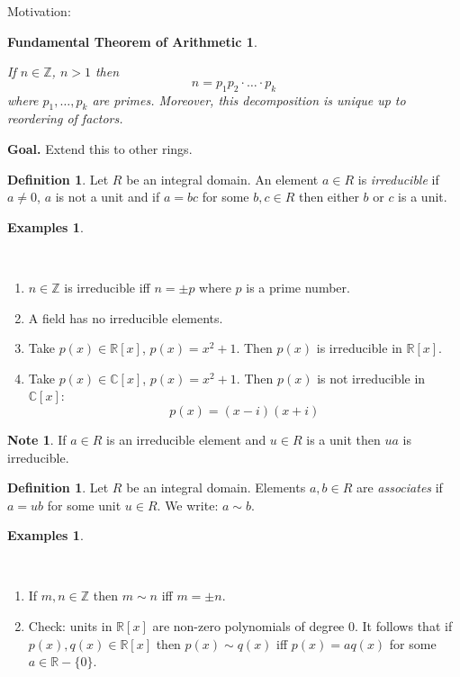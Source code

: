 \documentclass[12pt, letterpaper, oneside]{article}
\theoremstyle{plain}
\newtheorem{FTA}[theorem]{Fundamental Theorem of Arithmetic}
\theoremstyle{definition}
\newtheorem{definition}[theorem]{Definition}
\newtheorem{examples}[theorem]{Examples}
\newtheorem{note}[theorem]{Note}
\newcommand{\Z}{{\mathbb Z}}
\newcommand{\R}{{\mathbb R}}
\newcommand{\C}{{\mathbb C}}
\newcommand{\benu}{\begin{enumerate}}
\newcommand{\eenu}{\end{enumerate}}
\newcommand{\vs}{\vskip 5mm}
\newcommand{\isep}[1][0]{\setlength{\itemsep}{#1 mm}}
\begin{document}
Motivation:

\vs 

\begin{FTA}\ 
\label{THM_FTA}

\vskip -2mm

If $n\in \Z$, $n>1$ then 
$$n = p_{1}p_{2}\cdot{\dots}\cdot p_{k}$$
where $p_{1}, \dots, p_{k}$ are primes. Moreover, this decomposition 
is unique up to reordering of factors. 

\end{FTA}

\vs

\textbf{Goal.} Extend this to other rings. 

\vs\vs

\begin{definition}
Let $R$ be an integral domain. An element $a\in R$ is \emph{irreducible} if
$a\neq 0$, $a$ is not a unit and if $a = bc$ for some $b, c \in R$ then either 
$b$ or $c$ is a unit. 
\end{definition}


\vs\vs

\begin{examples}\ 

\vskip -13mm

\ 
\benu
\isep[5]
\item $n\in \Z$ is irreducible iff $n = \pm p$ where $p$ is a prime number. 
\item A field has no irreducible elements. 
\item Take $p(x)\in \R[x]$, $p(x) = x^{2}+1$. Then $p(x)$ is irreducible  in $\R[x]$. 
\item Take $p(x) \in \C[x]$, $p(x) = x^{2}+1$. Then $p(x)$ is not irreducible in $\C[x]$:
$$p(x) = (x-i)(x+i)$$
\eenu

\end{examples}

\vs\vs

\begin{note}
If $a\in R$ is an irreducible element and $u\in R$ is a unit then $ua$ is irreducible. 
\end{note}


\vs\vs

\begin{definition}
Let  $R$ be an integral domain. Elements $a, b\in R$ are \emph{associates} if $a = ub$
for some unit $u\in R$. We write: $a\sim b$.
\end{definition}


\vs\vs

\begin{examples}\ 

\vskip -13mm

\ 
\benu
\item If $m, n\in \Z$ then $m\sim n$ iff $m = \pm n$.
\item Check: units in $\R[x]$ are non-zero polynomials of degree 0. It follows that if 
$p(x), q(x)\in \R[x]$ then $p(x)\sim q(x)$ iff $p(x) = aq(x)$ for some $a\in \R-\{0\}$.
\eenu 

\end{examples}
\end{document}
